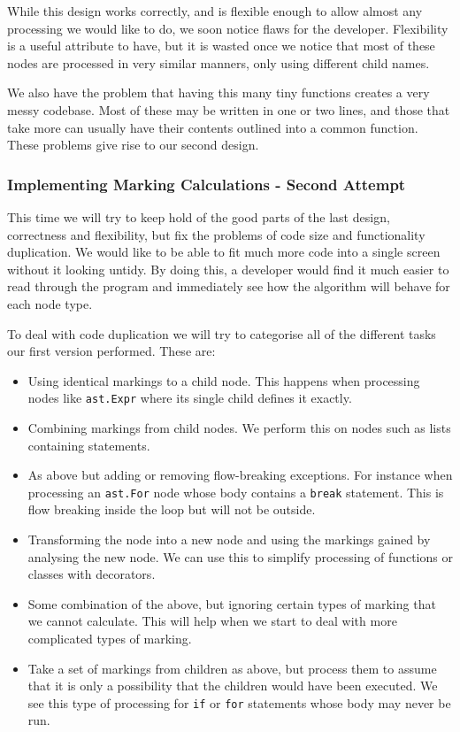 \documentclass{report}
\begin{document}
While this design works correctly, and is flexible enough to allow almost any processing we would like to do, we soon notice flaws for the developer.
Flexibility is a useful attribute to have, but it is wasted once we notice that most of these nodes are processed in very similar manners, only using
different child names.

We also have the problem that having this many tiny functions creates a very messy codebase. Most of these may be written in one or two lines, and those
that take more can usually have their contents outlined into a common function. These problems give rise to our second design.

\subsubsection{Implementing Marking Calculations - Second Attempt}

This time we will try to keep hold of the good parts of the last design, correctness and flexibility, but fix the problems of code size and functionality
duplication. We would like to be able to fit much more code into a single screen without it looking untidy. By doing this, a developer would find it much
easier to read through the program and immediately see how the algorithm will behave for each node type.

To deal with code duplication we will try to categorise all of the different tasks our first version performed. These are:

\begin{itemize}
\item Using identical markings to a child node. This happens when processing nodes like \texttt{ast.Expr} where its single child defines it exactly.
\item Combining markings from child nodes. We perform this on nodes such as lists containing statements.
\item As above but adding or removing flow-breaking exceptions. For instance when processing an \texttt{ast.For} node whose body contains a \texttt{break}
      statement. This is flow breaking inside the loop but will not be outside.
\item Transforming the node into a new node and using the markings gained by analysing the new node. We can use this to simplify processing of functions
      or classes with decorators.
\item Some combination of the above, but ignoring certain types of marking that we cannot calculate. This will help when we start to deal with more complicated
      types of marking.
\item Take a set of markings from children as above, but process them to assume that it is only a possibility that the children would have been executed. We 
      see this type of processing for \texttt{if} or \texttt{for} statements whose body may never be run.
\end{itemize}
\end{document}
